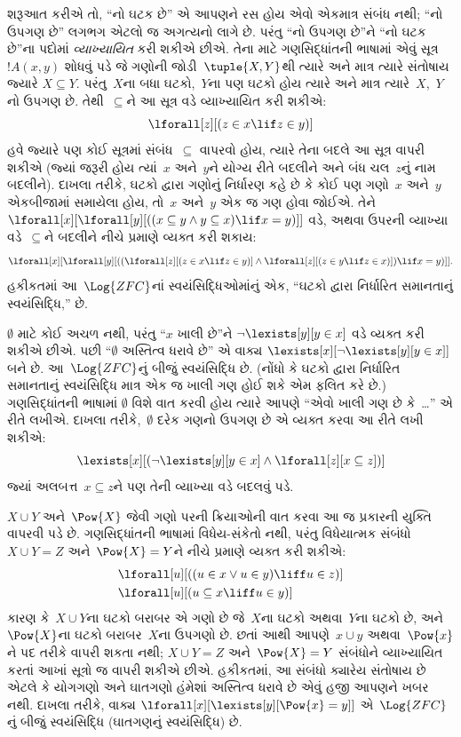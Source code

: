 શરૂઆત કરીએ તો, ``નો ઘટક છે'' એ આપણને રસ હોય એવો એકમાત્ર સંબંધ નથી;
``નો ઉપગણ છે'' લગભગ એટલો જ અગત્યનો લાગે છે. પરંતુ ``નો ઉપગણ છે''ને
``નો ઘટક છે''ના પદોમાં \emph{વ્યાખ્યાયિત} કરી શકીએ છીએ. તેના માટે
ગણસિદ્ધાંતની ભાષામાં એવું સૂત્ર~$!A(x,y)$ શોધવું પડે જે ગણોની
જોડી~$\tuple{X,Y}$થી ત્યારે અને માત્ર ત્યારે સંતોષાય જ્યારે
$X\subseteq Y$. પરંતુ~$X$ના બધા ઘટકો,~$Y$ના પણ ઘટકો
હોય ત્યારે અને માત્ર ત્યારે~$X$,~$Y$નો ઉપગણ છે. તેથી~$\subseteq$ને આ
સૂત્ર વડે વ્યાખ્યાયિત કરી શકીએ:
\[
\lforall[z][(z \in x \lif z \in y)]
\]
હવે જ્યારે પણ કોઈ સૂત્રમાં સંબંધ~$\subseteq$ વાપરવો હોય, ત્યારે તેના
બદલે આ સૂત્ર વાપરી શકીએ (જ્યાં જરૂરી હોય ત્યાં~$x$ અને~$y$ને યોગ્ય
રીતે બદલીને અને બંધ ચલ~$z$નું નામ બદલીને). દાખલા તરીકે, ઘટકો દ્વારા
ગણોનું નિર્ધારણ કહે છે કે કોઈ પણ ગણો~$x$ અને~$y$ એકબીજામાં સમાયેલા
હોય, તો~$x$ અને~$y$ એક જ ગણ હોવા જોઈએ. તેને
$\lforall[x][\lforall[y][((x\subseteq y\land y\subseteq x)\lif x=y)]]$
વડે, અથવા ઉપરની વ્યાખ્યા વડે~$\subseteq$ને બદલીને નીચે પ્રમાણે વ્યક્ત
કરી શકાય:
\[
\lforall[x][\lforall[y][((\lforall[z][(z \in x \lif z \in y)] \land
    \lforall[z][(z \in y \lif z \in x)]) \lif x = y)]].
\]
હકીકતમાં આ~$\Log{ZFC}$નાં સ્વયંસિદ્ધિઓમાંનું એક, ``ઘટકો દ્વારા
નિર્ધારિત સમાનતાનું સ્વયંસિદ્ધિ,'' છે.

$\emptyset$ માટે કોઈ અચળ નથી, પરંતુ ``$x$ ખાલી છે''ને
$\lnot\lexists[y][y\in x]$ વડે વ્યક્ત કરી શકીએ છીએ. પછી
``$\emptyset$ અસ્તિત્વ ધરાવે છે'' એ વાક્ય
$\lexists[x][\lnot\lexists[y][y\in x]]$ બને છે. આ~$\Log{ZFC}$નું બીજું
સ્વયંસિદ્ધિ છે. (નોંધો કે ઘટકો દ્વારા નિર્ધારિત સમાનતાનું સ્વયંસિદ્ધિ
માત્ર એક જ ખાલી ગણ હોઈ શકે એમ ફલિત કરે છે.) ગણસિદ્ધાંતની ભાષામાં
$\emptyset$ વિશે વાત કરવી હોય ત્યારે આપણે ``એવો ખાલી ગણ છે કે~\dots''
એ રીતે લખીએ. દાખલા તરીકે,~$\emptyset$ દરેક ગણનો ઉપગણ છે એ વ્યક્ત કરવા
આ રીતે લખી શકીએ:
\[
\lexists[x][(\lnot\lexists[y][y \in x] \land \lforall[z][x \subseteq
    z])]
\]
જ્યાં અલબત્ત~$x\subseteq z$ને પણ તેની વ્યાખ્યા વડે બદલવું પડે.

$X\cup Y$ અને~$\Pow{X}$ જેવી ગણો પરની ક્રિયાઓની વાત કરવા આ જ પ્રકારની
યુક્તિ વાપરવી પડે છે. ગણસિદ્ધાંતની ભાષામાં વિધેય-સંકેતો નથી, પરંતુ
વિધેયાત્મક સંબંધો~$X\cup Y=Z$ અને~$\Pow{X}=Y$ને નીચે પ્રમાણે વ્યક્ત
કરી શકીએ:
\begin{align*}
& \lforall[u][((u \in x \lor u \in y) \liff u \in z)]\\
& \lforall[u][(u \subseteq x \liff u \in y )]
\end{align*}
કારણ કે~$X\cup Y$ના ઘટકો બરાબર એ ગણો છે જે~$X$ના
ઘટકો અથવા~$Y$ના ઘટકો છે, અને~$\Pow{X}$ના ઘટકો
બરાબર~$X$ના ઉપગણો છે.
છતાં આથી આપણે~$x\cup y$ અથવા~$\Pow{x}$ને પદ તરીકે વાપરી શકતા નથી;
$X\cup Y=Z$ અને~$\Pow{X}=Y$ સંબંધોને વ્યાખ્યાયિત કરતાં આખાં
સૂત્રો જ વાપરી શકીએ છીએ. હકીકતમાં, આ સંબંધો ક્યારેય સંતોષાય છે
એટલે કે યોગગણો અને ઘાતગણો હંમેશાં અસ્તિત્વ ધરાવે છે એવું હજી આપણને
ખબર નથી. દાખલા તરીકે, વાક્ય
$\lforall[x][\lexists[y][\Pow{x}=y]]$ એ~$\Log{ZFC}$નું બીજું
સ્વયંસિદ્ધિ (ઘાતગણનું સ્વયંસિદ્ધિ) છે.

